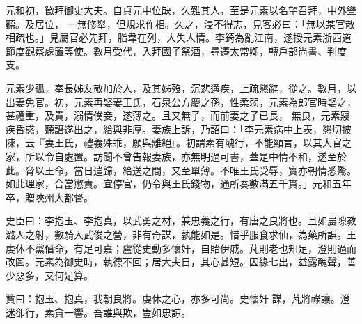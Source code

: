 \begin{pinyinscope}
 元和初，徵拜御史大夫。自貞元中位缺，久難其人，至是元素以名望召拜，中外聳聽。及居位，
 一無修舉，但規求作相。久之，浸不得志，見客必曰：「無以某官散相疏也。」見屬官必先拜，脂韋在列，大失人情。李錡為亂江南，遂授元素浙西道節度觀察處置等使。數月受代，入拜國子祭酒，尋遷太常卿，轉戶部尚書、判度支。



 元素少孤，奉長姊友敬加於人，及其姊歿，沉悲遘疾，上疏懇辭，從之。數月，以出妻免官。初，元素再娶妻王氏，石泉公方慶之孫，性柔弱，元素為郎官時娶之，甚禮重，及貴，溺情僕妾，遂薄之。且又無子，而前妻之子已長，
 無良，元素寢疾昏惑，聽譖遂出之，給與非厚。妻族上訴，乃詔曰：「李元素病中上表，懇切披陳，云『妻王氏，禮義殊乖，願與離絕』。初謂素有醜行，不能顯言，以其大官之家，所以令自處置。訪聞不曾告報妻族，亦無明過可書，蓋是中情不和，遂至於此。脅以王命，當日遣歸，給送之間，又至單薄。不唯王氏受辱，實亦朝情悉驚。如此理家，合當懲責。宜停官，仍令與王氏錢物，通所奏數滿五千貫。」元和五年卒，贈陜州大都督。



 史臣曰：李抱玉、李抱真，以武勇之材，兼忠義之行，有唐之良將也。且如農隙教潞人之射，數騎入武俊之營，非有奇謀，孰能如是。惜乎服食求仙，為藥所誤。王虔休不黨僭命，有足可嘉；盧從史動多懷奸，自貽伊戚。芃則老也知足，澄則過而改圖。元素為御史時，執德不回；居大夫日，其心甚短。因緣七出，益露醜聲，善少惡多，又何足算。



 贊曰：抱玉、抱真，我朝良將。虔休之心，亦多可尚。史懷奸
 謀，芃將祿讓。澄迷卻行，素貪一響。吾誰與欺，豈如忠諒。



\end{pinyinscope}